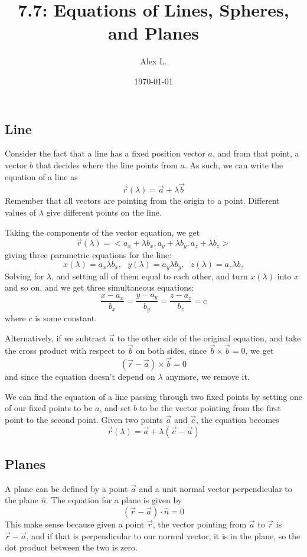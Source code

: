 \documentclass{article}
\title{7.7: Equations of Lines, Spheres, and Planes}
\author{Alex L.}
\date{\today}
\begin{document}
\maketitle

\subsection{Line}

Consider the fact that a line has a fixed position vector $a$, and from that point, a vector $b$ that decides where the line points from $a$. As such, we can write the equation of a line as $$\vec{r}(\lambda) = \vec{a} + \lambda\vec{b}$$Remember that all vectors are pointing from the origin to a point. Different values of $\lambda$ give different points on the line. 

Taking the components of the vector equation, we get $$\vec{r}(\lambda) = <a_x + \lambda b_x, a_y + \lambda b_y, a_z + \lambda b_z>$$giving three parametric equations for the line: $$x(\lambda) = a_x \lambda b_x,\ \ \ y(\lambda) = a_y \lambda b_y,\ \ \ z(\lambda) = a_z \lambda b_z$$Solving for $\lambda$, and setting all of them equal to each other, and turn $x(\lambda)$ into $x$ and so on, and we get three simultaneous equations:$$\frac{x -a_x}{b_x} = \frac{y - a_y}{b_y} = \frac{z - a_z}{b_z} = c$$where $c$ is some constant. 

Alternatively, if we subtract $\vec{a}$ to the other side of the original equation, and take the cross product with respect to $\vec{b}$ on both sides, since $\vec{b} \times \vec{b} = 0$, we get$$(\vec{r} - \vec{a}) \times \vec{b} = 0$$and since the equation doesn't depend on $\lambda$ anymore, we remove it. 

We can find the equation of a line passing through two fixed points by setting one of our fixed points to be $a$, and set $b$ to be the vector pointing from the first point to the second point. Given two points $\vec{a}$ and $\vec{c}$, the equation becomes $$\vec{r}(\lambda) = \vec{a} + \lambda(\vec{c} - \vec{a})$$

\subsection{Planes}

A plane can be defined by a point $\vec{a}$ and a unit normal vector perpendicular to the plane $\hat{n}$. The equation for a plane is given by$$(\vec{r}-\vec{a})\cdot \hat{n} = 0$$This make sense because given a point $\vec{r}$, the vector pointing from $\vec{a}$ to $\vec{r}$ is $\vec{r} - \vec{a}$, and if that is perpendicular to our normal vector, it is in the plane, so the dot product between the two is zero. 
\end{document}
